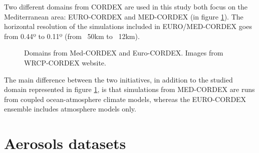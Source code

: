 Two different domains from CORDEX are used in this study both focus on the Mediterranean area: EURO-CORDEX and MED-CORDEX (in figure \ref{fig:cordexdomain}). The horizontal resolution of the simulations included in EURO/MED-CORDEX goes from 0.44º to 0.11º (from ~50km to ~12km).

\begin{figure}[!tbp]
  \centering
  \hfill
  \caption[The EURO and MED-CORDEX projects domains]{Domains from Med-CORDEX and Euro-CORDEX. Images from WRCP-CORDEX website.}
    \label{fig:cordexdomain}
\end{figure}

The main difference between the two initiatives, in addition to the studied domain represented in figure \ref{fig:cordexdomain}, is that simulations from MED-CORDEX \cite*{Ruti2016} are runs from coupled ocean-atmosphere climate models, whereas the EURO-CORDEX \cite*{Jacob2014} ensemble includes atmosphere models only. %


\section{Aerosols datasets}

